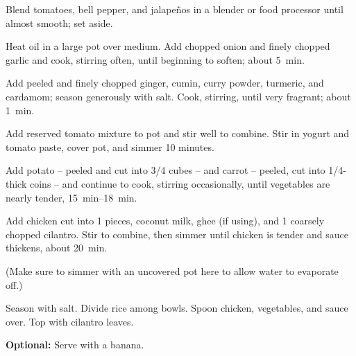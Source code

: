 \begin{recipe}
{		\step Blend tomatoes, bell pepper, and jalapeños in a blender or food processor until almost smooth; set aside.

		\step Heat oil in a large pot over medium. Add chopped onion and finely chopped garlic and cook, stirring often, until beginning to soften; about \SI{5}{\minute}.

		\step Add peeled and finely chopped ginger, cumin, curry powder, turmeric, and cardamom; season generously with salt. Cook, stirring, until very fragrant; about \SI{1}{\minute}.

		\step Add reserved tomato mixture to pot and stir well to combine. Stir in yogurt and tomato paste, cover pot, and simmer 10 minutes.

		\step Add potato -- peeled and cut into \SI{3/4}{\inch} cubes -- and carrot -- peeled, cut into \SI{1/4}{\inch}-thick coins -- and continue to cook, stirring occasionally, until vegetables are nearly tender, \SIrange{15}{18}{\minute}.

		\step Add chicken cut into \SI{1}{\inch} pieces, coconut milk, ghee (if using), and \SI{1}{\cup} coarsely chopped cilantro. Stir to combine, then simmer until chicken is tender and sauce thickens, about \SI{20}{\minute}.

		(Make sure to simmer with an uncovered pot here to allow water to evaporate off.)

		\step Season with salt. Divide rice among bowls. Spoon chicken, vegetables, and sauce over. Top with cilantro leaves.

		\textbf{Optional:} Serve with a banana.
	}

\end{recipe}